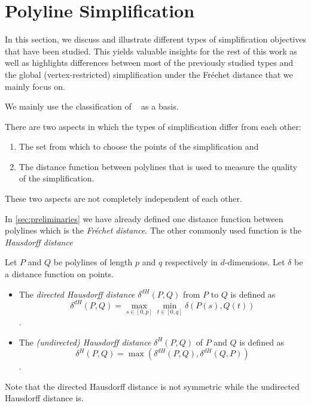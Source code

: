 \section{Polyline Simplification}\label{sec:polyline-simplification}
In this section, we discuss and illustrate different types of simplification objectives that have been studied. 
This yields valuable insights for the rest of this work as well as highlights differences between most of the previously studied
types and the global (vertex-restricted) simplification under the Fréchet distance that we mainly focus on.

We mainly use the classification of \citeauthor{global_curve_simplification}~\cite{global_curve_simplification} as a basis. 

There are two aspects in which the types of simplification differ from each other:
\begin{enumerate}
  \item The set from which to choose the points of the simplification and 
	\item The distance function between polylines that is used to measure the quality of the simplification. 
\end{enumerate}

These two aspects are not completely independent of each other.

In \cref{sec:preliminaries} we have already defined one distance function between polylines which is the \emph{Fréchet distance}. The other commonly used function is the \emph{Hausdorff distance}

\begin{definition}
  Let \(P\) and \(Q\) be polylines of length \(p\) and \(q\) respectively in \(d\)-dimensions. Let \(\delta\) be a distance function on points. 

	\begin{itemize}
		\item The \emph{directed Hausdorff distance} \(\delta^{dH}(P, Q)\) from \(P\) to \(Q\) is defined as 
		\[\delta^{dH}(P, Q) = \max_{s \in [0, p]}\min_{t \in [0, q]} \delta(P(s), Q(t))\].
		\item The \emph{(undirected) Hausdorff distance} \(\delta^{H}(P, Q)\) of \(P\) and \(Q\) is defined as 
		\[\delta^{H}(P, Q) = \max(\delta^{dH}(P, Q), \delta^{dH}(Q, P))\].
	\end{itemize}

	Note that the directed Hausdorff distance is not symmetric while the undirected Hausdorff distance is.
\end{definition}


